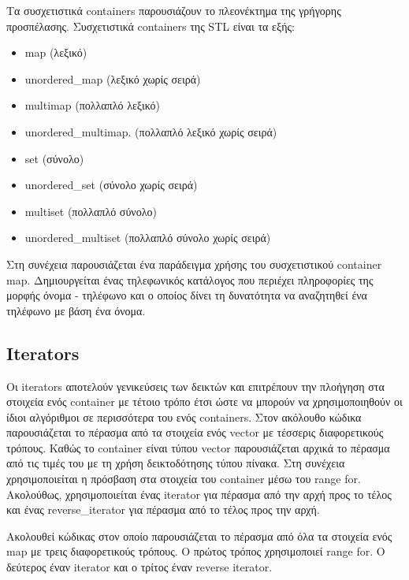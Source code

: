 Τα συσχετιστικά containers παρουσιάζουν το πλεονέκτημα της γρήγορης προσπέλασης. Συσχετιστικά containers της STL είναι τα εξής: 
\begin{itemize}[noitemsep]
\item map (λεξικό)
\item unordered\_map (λεξικό χωρίς σειρά)
\item multimap (πολλαπλό λεξικό)
\item unordered\_multimap. (πολλαπλό λεξικό χωρίς σειρά)
\item set (σύνολο)
\item unordered\_set (σύνολο χωρίς σειρά)
\item multiset (πολλαπλό σύνολο)
\item unordered\_multiset (πολλαπλό σύνολο χωρίς σειρά)
\end{itemize}

Στη συνέχεια παρουσιάζεται ένα παράδειγμα χρήσης του συσχετιστικού container map. Δημιουργείται ένας τηλεφωνικός κατάλογος που περιέχει πληροφορίες της μορφής όνομα - τηλέφωνο και ο οποίος δίνει τη δυνατότητα να αναζητηθεί ένα τηλέφωνο με βάση ένα όνομα.






\subsection{Iterators}
Οι iterators αποτελούν γενικεύσεις των δεικτών και επιτρέπουν την πλοήγηση στα στοιχεία ενός container με τέτοιο τρόπο έτσι ώστε να μπορούν να χρησιμοποιηθούν οι ίδιοι αλγόριθμοι σε περισσότερα του ενός containers. Στον ακόλουθο κώδικα παρουσιάζεται το πέρασμα από τα στοιχεία ενός vector με τέσσερις διαφορετικούς τρόπους. Καθώς το container είναι τύπου vector παρουσιάζεται αρχικά το πέρασμα από τις τιμές του με τη χρήση δεικτοδότησης τύπου πίνακα. Στη συνέχεια χρησιμοποιείται η πρόσβαση στα στοιχεία του container μέσω του range for. Ακολούθως, χρησιμοποιείται ένας iterator για πέρασμα από την αρχή προς το τέλος και ένας reverse\_iterator για πέρασμα από το τέλος προς την αρχή. 





Ακολουθεί κώδικας στον οποίο παρουσιάζεται το πέρασμα από όλα τα στοιχεία ενός map με τρεις διαφορετικούς τρόπους. Ο πρώτος τρόπος χρησιμοποιεί range for. Ο δεύτερος έναν iterator και ο τρίτος έναν reverse iterator.

